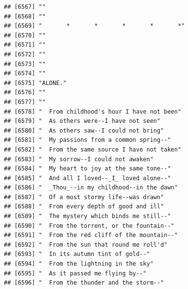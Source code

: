 \documentclass{article}\usepackage[]{graphicx}\usepackage[]{color}
\makeatletter
\newenvironment{kframe}{%
 \def\at@end@of@kframe{}%
 \ifinner\ifhmode%
  \def\at@end@of@kframe{\end{minipage}}%
  \begin{minipage}{\columnwidth}%
 \fi\fi%
 \def\FrameCommand##1{\hskip\@totalleftmargin \hskip-\fboxsep
 \colorbox{shadecolor}{##1}\hskip-\fboxsep
     \hskip-\linewidth \hskip-\@totalleftmargin \hskip\columnwidth}%
 \MakeFramed {\advance\hsize-\width
   \@totalleftmargin\z@ \linewidth\hsize
   \@setminipage}}%
 {\par\unskip\endMakeFramed%
 \at@end@of@kframe}
\newenvironment{knitrout}{}{} %
\makeatother
\begin{document}
\begin{knitrout}
\begin{kframe}
\begin{verbatim}
## [6567] ""                                                                            
## [6568] ""                                                                            
## [6569] "       *       *       *       *       *"                                    
## [6570] ""                                                                            
## [6571] ""                                                                            
## [6572] ""                                                                            
## [6573] ""                                                                            
## [6574] ""                                                                            
## [6575] "ALONE."                                                                      
## [6576] ""                                                                            
## [6577] ""                                                                            
## [6578] "  From childhood's hour I have not been"                                     
## [6579] "  As others were--I have not seen"                                           
## [6580] "  As others saw--I could not bring"                                          
## [6581] "  My passions from a common spring--"                                        
## [6582] "  From the same source I have not taken"                                     
## [6583] "  My sorrow--I could not awaken"                                             
## [6584] "  My heart to joy at the same tone--"                                        
## [6585] "  And all I loved--_I_ loved alone--"                                        
## [6586] "  _Thou_--in my childhood--in the dawn"                                      
## [6587] "  Of a most stormy life--was drawn"                                          
## [6588] "  From every depth of good and ill"                                          
## [6589] "  The mystery which binds me still--"                                        
## [6590] "  From the torrent, or the fountain--"                                       
## [6591] "  From the red cliff of the mountain--"                                      
## [6592] "  From the sun that round me roll'd"                                         
## [6593] "  In its autumn tint of gold--"                                              
## [6594] "  From the lightning in the sky"                                             
## [6595] "  As it passed me flying by--"                                               
## [6596] "  From the thunder and the storm--"                                          

\end{verbatim}
\end{kframe}
\end{knitrout}
\end{document}
